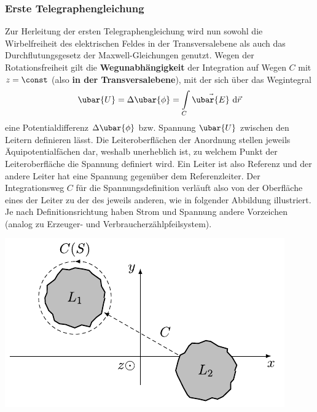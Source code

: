 \subsubsection{Erste Telegraphengleichung}
Zur Herleitung der ersten Telegraphengleichung wird nun sowohl die Wirbelfreiheit des elektrischen Feldes in der Transversalebene als auch das Durchflutungsgesetz der Maxwell-Gleichungen genutzt. Wegen der Rotationsfreiheit gilt die \textbf{Wegunabhängigkeit} der Integration auf Wegen $C$ mit $z=\const$ (also \textbf{in der Transversalebene}), mit der sich über das Wegintegral
\begin{equation}
	\ubar{U}=\Delta \ubar{\phi}=\int\limits_{C} \vec{\ubar{E}} \mathrm{~d} \vec{r} 
\end{equation}
eine Potentialdifferenz $\Delta \ubar{\phi}$ bzw. Spannung $\ubar{U}$ zwischen den Leitern definieren lässt. Die Leiteroberflächen der Anordnung stellen jeweils Äquipotentialfächen dar, weshalb unerheblich ist, zu welchem Punkt der Leiteroberfläche die Spannung definiert wird. Ein Leiter ist also Referenz und der andere Leiter hat eine Spannung gegenüber dem Referenzleiter. Der Integrationsweg $C$ für die Spannungsdefinition verläuft also von der Oberfläche eines der Leiter zu der des jeweils anderen, wie in folgender Abbildung illustriert. Je nach Definitionsrichtung haben Strom und Spannung andere Vorzeichen (analog zu Erzeuger- und Verbraucherzählpfeilsystem).
\begin{center}
	\includegraphics{res/LT1}
\end{center}
